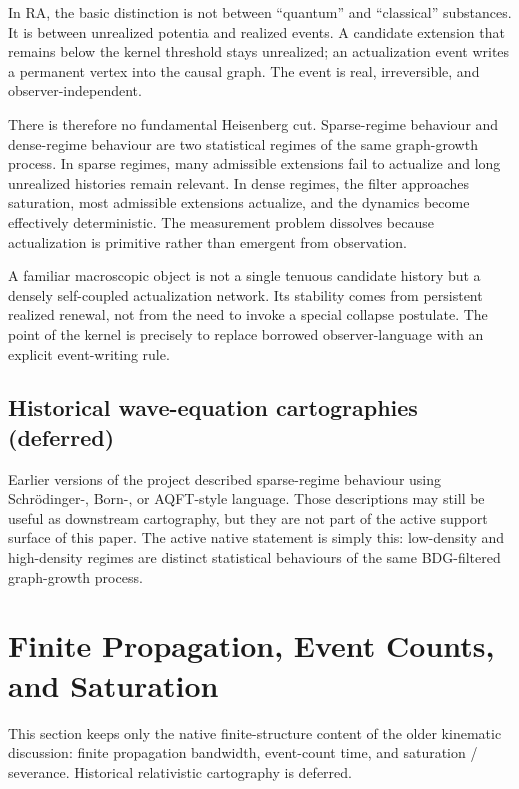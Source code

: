 \documentclass[11pt]{article}
\begin{document}
In RA, the basic distinction is not between ``quantum'' and ``classical'' substances. It is between unrealized potentia and realized events. A candidate extension that remains below the kernel threshold stays unrealized; an actualization event writes a permanent vertex into the causal graph. The event is real, irreversible, and observer-independent.

There is therefore no fundamental Heisenberg cut. Sparse-regime behaviour and dense-regime behaviour are two statistical regimes of the same graph-growth process. In sparse regimes, many admissible extensions fail to actualize and long unrealized histories remain relevant. In dense regimes, the filter approaches saturation, most admissible extensions actualize, and the dynamics become effectively deterministic. The measurement problem dissolves because actualization is primitive rather than emergent from observation.

A familiar macroscopic object is not a single tenuous candidate history but a densely self-coupled actualization network. Its stability comes from persistent realized renewal, not from the need to invoke a special collapse postulate. The point of the kernel is precisely to replace borrowed observer-language with an explicit event-writing rule.

\subsection{Historical wave-equation cartographies (deferred)}

Earlier versions of the project described sparse-regime behaviour using Schr\"odinger-, Born-, or AQFT-style language. Those descriptions may still be useful as downstream cartography, but they are not part of the active support surface of this paper. The active native statement is simply this: low-density and high-density regimes are distinct statistical behaviours of the same BDG-filtered graph-growth process.

\section{Finite Propagation, Event Counts, and Saturation}
\label{sec:relativistic}

This section keeps only the native finite-structure content of the older kinematic discussion: finite propagation bandwidth, event-count time, and saturation / severance. Historical relativistic cartography is deferred.
\end{document}
